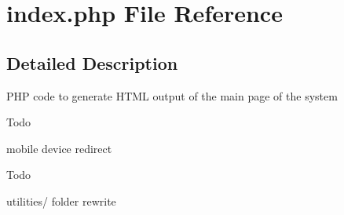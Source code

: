 \section{index.\+php File Reference}
\label{index_8php}


\subsection{Detailed Description}
P\+HP code to generate H\+T\+ML output of the main page of the system

\begin{DoxyRefDesc}{Todo}
\item[{\bf Todo}]mobile device redirect\end{DoxyRefDesc}


\begin{DoxyRefDesc}{Todo}
\item[{\bf Todo}]utilities/ folder rewrite \end{DoxyRefDesc}
